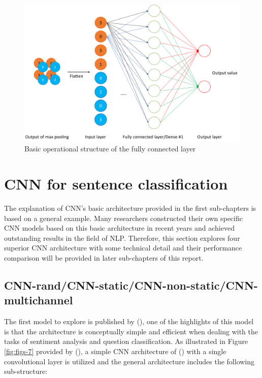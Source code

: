 \documentclass[]{krantz}
\begin{document}
\begin{figure}[ht]

{\centering \includegraphics[width=0.6\linewidth]{figures/01-03-cnns-and-their-applications-in-nlp/Fully_Connected} 

}

\caption{Basic operational structure of the fully connected layer}\label{fig:figs-6}
\end{figure}

\hypertarget{cnn-for-sentence-classification}{%
\section{CNN for sentence classification}\label{cnn-for-sentence-classification}}

The explanation of CNN's basic architecture provided in the first sub-chapters is based on a general example. Many researchers constructed their own specific CNN models based on this basic architecture in recent years and achieved outstanding results in the field of NLP. Therefore, this section explores four superior CNN architecture with some technical detail and their performance comparison will be provided in later sub-chapters of this report.

\hypertarget{cnn-randcnn-staticcnn-non-staticcnn-multichannel}{%
\subsection{CNN-rand/CNN-static/CNN-non-static/CNN-multichannel}\label{cnn-randcnn-staticcnn-non-staticcnn-multichannel}}

The first model to explore is published by (\citet{Kim2014ConvolutionalNN}), one of the highlights of this model is that the architecture is conceptually simple and efficient when dealing with the tasks of sentiment analysis and question classification. As illustrated in Figure \ref{fig:figs-7} provided by (\citet{Kim2014ConvolutionalNN}), a simple CNN architecture of (\citet{Collobert2011NaturalLP}) with a single convolutional layer is utilized and the general architecture includes the following sub-structure:
\end{document}
